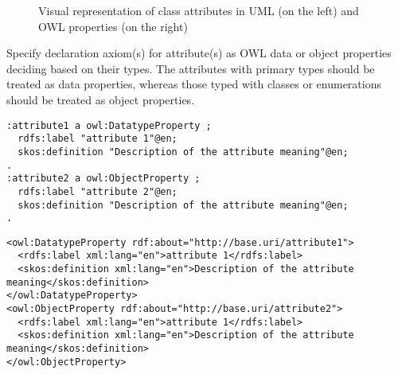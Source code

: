 \begin{figure}[!ht]
	\centering
	\begin{subfigure}{.35\textwidth}
		\centering
	\end{subfigure}%
	\begin{subfigure}{.65\textwidth}
		\centering
	\end{subfigure}
	\caption{Visual representation of class attributes in UML (on the left) and OWL properties (on the right)}
	\label{fig:attribute-visual}
\end{figure}

\begin{trule}
	\label{rule:attribute-core}
	Specify declaration axiom(s) for attribute(s) as OWL data or object properties deciding based on their types. The attributes with primary types	should be treated as data properties, whereas those typed with classes or enumerations should be treated as object properties.
\end{trule}

\vspace{-\parskip}
\begin{minipage}[b]{.45\textwidth}
\begin{lstlisting}[language=Turtle, caption={Property declaration in Turtle syntax}, captionpos=b]
:attribute1 a owl:DatatypeProperty ;
  rdfs:label "attribute 1"@en;
  skos:definition "Description of the attribute meaning"@en;
.
:attribute2 a owl:ObjectProperty ;
  rdfs:label "attribute 2"@en;
  skos:definition "Description of the attribute meaning"@en;
.
\end{lstlisting}
\end{minipage}%
\quad\vspace{-\parskip}
\begin{minipage}[b]{.5\textwidth}
\begin{lstlisting}[language=RDF/XML, caption={Property declaration in  RDF/XML syntax}, captionpos=b]
<owl:DatatypeProperty rdf:about="http://base.uri/attribute1">
  <rdfs:label xml:lang="en">attribute 1</rdfs:label>
  <skos:definition xml:lang="en">Description of the attribute meaning</skos:definition>  
</owl:DatatypeProperty>  
<owl:ObjectProperty rdf:about="http://base.uri/attribute2">
  <rdfs:label xml:lang="en">attribute 1</rdfs:label>
  <skos:definition xml:lang="en">Description of the attribute meaning</skos:definition>  
</owl:ObjectProperty>
\end{lstlisting}
\end{minipage}
\vspace{-\parskip}

